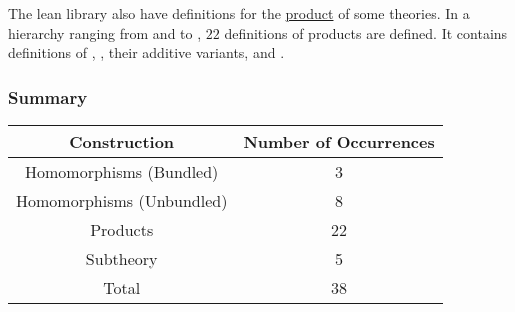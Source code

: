 The lean library also have definitions for the 
\href{https://github.com/leanprover-community/mathlib/blob/4bb8d4475f897c8997100d31fe84b33050444374/src/algebra/pi_instances.lean}{product} 
of some theories. In a hierarchy ranging from  and  to , $22$ definitions of products are defined. 
It contains definitions of 
\href{https://github.com/leanprover-community/mathlib/blob/4bb8d4475f897c8997100d31fe84b33050444374/src/group_theory/submonoid.lean}{},
\href{https://github.com/leanprover-community/mathlib/blob/4bb8d4475f897c8997100d31fe84b33050444374/src/group_theory/subgroup.lean}{}, 
their additive variants, and  
\href{https://github.com/leanprover-community/mathlib/blob/4bb8d4475f897c8997100d31fe84b33050444374/src/ring_theory/subring.lean}{} . %


\subsubsection*{Summary}
\begin{center}%
\begin{tabular}{| c || c |}
\hline 
\textbf{Construction} & \textbf{Number of Occurrences} \\ \hline 
Homomorphisms (Bundled) & 3 \\ \hline
Homomorphisms (Unbundled)& 8  \\ \hline
Products & 22 \\ \hline
Subtheory & 5 \\ \hline\hline 
Total & 38 \\ \hline 
\end{tabular}
\end{center}



